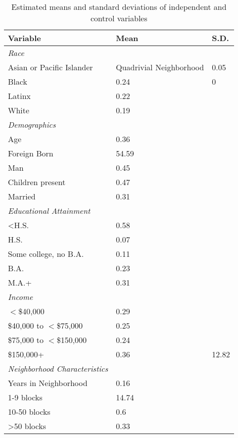 \begin{table}[ht]
\centering
\caption{Estimated means and standard deviations of independent and control variables} 
\begin{tabular}{lp{.5in}p{.5in}}
  \toprule
Variable & Mean & S.D. \\ 
  \midrule
\emph{Race}&&\\Asian or Pacific Islander & Quadrivial Neighborhood & 0.05 \\ 
  Black & 0.24 & 0 \\ 
  Latinx & 0.22 &  \\ 
  White & 0.19 &  \\ 
  \emph{Demographics}&&\\Age & 0.36 &  \\ 
  Foreign Born & 54.59 &  \\ 
  Man & 0.45 &  \\ 
  Children present & 0.47 &  \\ 
  Married & 0.31 &  \\ 
  \emph{Educational Attainment}&&\\<H.S. & 0.58 &  \\ 
  H.S. & 0.07 &  \\ 
  Some college, no B.A. & 0.11 &  \\ 
  B.A. & 0.23 &  \\ 
  M.A.+ & 0.31 &  \\ 
  \emph{Income}&&\\$<$\$40,000 & 0.29 &  \\ 
  \$40,000 to $<$\$75,000 & 0.25 &  \\ 
  \$75,000 to $<$\$150,000 & 0.24 &  \\ 
  \$150,000+ & 0.36 & 12.82 \\ 
  \emph{Neighborhood Characteristics}\\Years in Neighborhood & 0.16 &  \\ 
  1-9 blocks & 14.74 &  \\ 
  10-50 blocks & 0.6 &  \\ 
  >50 blocks & 0.33 &  \\ 
   \bottomrule
\end{tabular}
\end{table}

